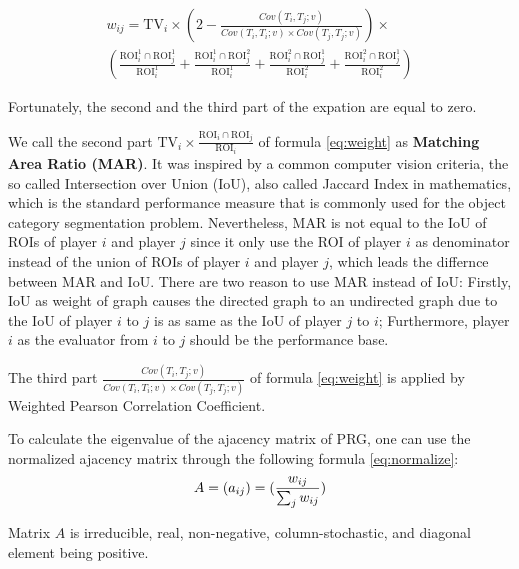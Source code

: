   \begin{multline}
  \label{eq:expand}
  w_{ij} = \text{TV}_i \times \left(2-\frac{Cov(T_i, T_j; v)}{Cov(T_i, T_i; v)\times Cov(T_j, T_j; v)}\right) \times \\
    \left( \frac{\text{ROI}_i^1\cap\text{ROI}_j^1}{\text{ROI}_i^1}           
    + \frac{\text{ROI}_i^1\cap\text{ROI}_j^2}{\text{ROI}_i^1}           
    + \frac{\text{ROI}_i^2\cap\text{ROI}_j^1}{\text{ROI}_i^2}           
    + \frac{\text{ROI}_i^2\cap\text{ROI}_j^1}{\text{ROI}_i^2} \right)
  \end{multline}

  Fortunately, the second and the third part of the expation are equal to zero.

  We call the second part $\text{TV}_i \times \frac{\text{ROI}_i\cap\text{ROI}_j}{\text{ROI}_i}$ 
  of formula \ref{eq:weight} as \textbf{Matching Area Ratio (MAR)}. 
  It was inspired by a common computer vision criteria,
  the so called Intersection over Union (IoU), also called Jaccard Index in mathematics\cite{real1996probabilistic},
  which is the standard performance measure that is commonly used for the object category segmentation problem.
  Nevertheless, MAR is not equal to the IoU of ROIs of player $i$  and player $j$ since
  it only use the ROI of player $i$ as denominator instead of the union of ROIs of player $i$ and player $j$,
  which leads the differnce between MAR and IoU. There are two reason to use MAR instead of IoU:
  Firstly, IoU as weight of graph causes the directed graph to an undirected graph due to the IoU of player $i$ to $j$
  is as same as the IoU of player $j$ to $i$; Furthermore, player $i$ as the evaluator from $i$ to $j$ 
  should be the performance base.

  The third part $\frac{Cov(T_i, T_j; v)}{Cov(T_i, T_i; v)\times Cov(T_j, T_j; v)}$
  of formula \ref{eq:weight} is applied by Weighted Pearson Correlation Coefficient.
  
  To calculate the eigenvalue of the ajacency matrix of PRG, one can use the normalized ajacency matrix 
  through the following formula \ref{eq:normalize}:
  \begin{equation}
  \label{eq:normalize}
  A = (a_{ij}) = (\frac{w_{ij}}{\sum_{j}{w_{ij}}})\\
  \end{equation}

  \begin{theorem}
  Matrix $A$ is irreducible, real, non-negative, column-stochastic, and diagonal element being positive.
  \end{theorem}

